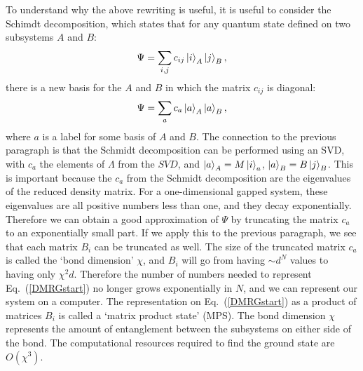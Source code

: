 To understand why the above rewriting is useful, it is useful to consider the Schimdt decomposition, which states that for any quantum state defined on two subsystems $A$ and $B$:
\begin{equation}
\Psi=\sum_{i,j}c_{ij}\ket{i}_A\ket{j}_B,
\end{equation}
there is a new basis for the $A$ and $B$ in which the matrix $c_{ij}$ is diagonal:
\begin{equation}
\Psi=\sum_{a}c_{a}\ket{a}_A\ket{a}_B,
\end{equation}
where $a$ is a label for some basis of $A$ and $B$. The connection to the previous paragraph is that the Schmidt decomposition can be performed using an SVD, with $c_a$ the elements of $\Lambda$ from the $SVD$, and $\ket{a}_A=M\ket{i}_a$, $\ket{a}_B=B\ket{j}_B$. This is important because the $c_a$ from the Schmidt decomposition are the eigenvalues of the reduced density matrix. For a one-dimensional gapped system, these eigenvalues are all positive numbers less than one, and they decay exponentially. Therefore we can obtain a good approximation of $\Psi$ by truncating the matrix $c_a$ to an exponentially small part. If we apply this to the previous paragraph, we see that each matrix $B_i$ can be truncated as well. The size of the truncated matrix $c_a$ is called the `bond dimension' $\chi$, and $B_i$ will go from having $\sim d^N$ values to having only $\chi^2 d$. Therefore the number of numbers needed to represent Eq.~(\ref{DMRGstart}) no longer grows exponentially in $N$, and we can represent our system on a computer. The representation on Eq.~(\ref{DMRGstart}) as a product of matrices $B_i$ is called a `matrix product state' (MPS). The bond dimension $\chi$ represents the amount of entanglement between the subsystems on either side of the bond. The computational resources required to find the ground state are $O(\chi^3)$.

